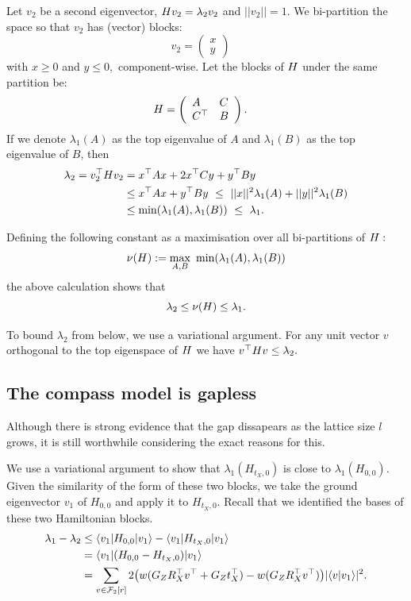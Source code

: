 \documentclass[12pt]{article}
\begin{document}
Let $v_2$ be a second eigenvector, $ H v_2 = \lambda_2 v_2 $ 
and $||v_2||=1$.
We bi-partition the space 
so that $v_2$ has (vector) blocks:
$$
v_2 = \left( \begin{array}{l}
x\\
y\end{array} \right)\quad
$$
with $x\ge 0$ and $y\le 0,$ component-wise.
Let the blocks of $H$ under the same partition be:
$$
H = \left( \begin{array}{ll}
A&C\\
C^\top&B\end{array} \right).\quad
$$
If we denote $\lambda_1(A)$ as the top eigenvalue of $A$ and
$\lambda_1(B)$ as the top eigenvalue of $B$,
then
\begin{align*}
\lambda_2 = v_2^\top H v_2 &= x^\top A x + 2 x^\top C y + y^\top B y \\
        &\le x^\top A x + y^\top B y\ \le\ ||x||^2 \lambda_1(A) + ||y||^2 \lambda_1(B) \\
        &\le \mbox{min}(\lambda_1(A), \lambda_1(B))\ \le\ \lambda_1.
\end{align*}

Defining the following constant as a maximisation over
all bi-partitions of $H:$
$$
    \nu(\Ham) := \max_{A, B}\ \mbox{min}(\lambda_1(A), \lambda_1(B))
$$
the above calculation shows that
$$
    \lambda_2 \le \nu(H) \le \lambda_1.
$$

To bound $\lambda_2$ from below, we use a variational argument.
For any unit vector $v$ orthogonal to the top eigenspace of $H$ we
have $v^\top H v \le \lambda_2.$


%

\subsection{The compass model is gapless}

Although there is strong evidence that the gap dissapears as the lattice size
$l$ grows, it is still worthwhile considering the exact reasons for this.

We use a variational argument to show that $\lambda_1(H_{t_X,0})$
is close to $\lambda_1(H_{0,0}).$
Given the similarity of the form of these two blocks, we
take the ground eigenvector $v_1$ of $H_{0,0}$ and apply it
to $H_{t_X,0}$. %
Recall that we identified the bases of these two Hamiltonian blocks.
\begin{align*}
    \lambda_1 - \lambda_2 &\le \langle{v_1}|H_{0,0}|{v_1}\rangle - \langle{v_1}|H_{t_X,0}|{v_1}\rangle  \\
            &= \langle{v_1}|(H_{0,0} - H_{t_X,0})|{v_1}\rangle  \\
    &= \sum_{v\in\mathcal{F}_2[r]} 2\bigl(w(G_Z R_X^\top v^\top + G_Z t_X^\top) -w(G_Z R_X^\top v^\top)\bigr) 
    |\langle{v}|{v_1}\rangle|^2.
\end{align*}
\end{document}
